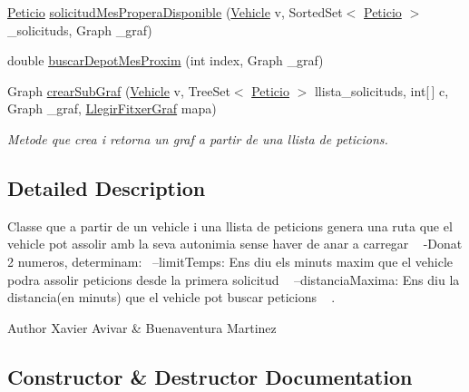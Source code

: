 \begin{DoxyCompactItemize}
\hyperlink{class_portam_a_pro_p_1_1_peticio}{Peticio} \hyperlink{class_portam_a_pro_p_1_1_greedy_aee6b3c5abeb729501fdf82a213ad60b5}{solicitud\+Mes\+Propera\+Disponible} (\hyperlink{class_portam_a_pro_p_1_1_vehicle}{Vehicle} v, Sorted\+Set$<$ \hyperlink{class_portam_a_pro_p_1_1_peticio}{Peticio} $>$ \+\_\+solicituds, Graph \+\_\+graf)
\item 
double \hyperlink{class_portam_a_pro_p_1_1_greedy_a452e5f5e1fd5489666fd9687d91b89c4}{buscar\+Depot\+Mes\+Proxim} (int index, Graph \+\_\+graf)
\item 
Graph \hyperlink{class_portam_a_pro_p_1_1_greedy_ad535a1ddb039e8d8c3d9e61d3d4caee9}{crear\+Sub\+Graf} (\hyperlink{class_portam_a_pro_p_1_1_vehicle}{Vehicle} v, Tree\+Set$<$ \hyperlink{class_portam_a_pro_p_1_1_peticio}{Peticio} $>$ llista\+\_\+solicituds, int\mbox{[}$\,$\mbox{]} c, Graph \+\_\+graf, \hyperlink{class_portam_a_pro_p_1_1_llegir_fitxer_graf}{Llegir\+Fitxer\+Graf} mapa)
\begin{DoxyCompactList}\small\item\em Metode que crea i retorna un graf a partir de una llista de peticions. \end{DoxyCompactList}\end{DoxyCompactItemize}


\subsection{Detailed Description}
Classe que a partir de un vehicle i una llista de peticions genera una ruta que el vehicle pot assolir amb la seva autonimia sense haver de anar a carregar ~\newline
-\/\+Donat 2 numeros, determinam\+:~\newline
--limit\+Temps\+: Ens diu els minuts maxim que el vehicle podra assolir peticions desde la primera solicitud ~\newline
--distancia\+Maxima\+: Ens diu la distancia(en minuts) que el vehicle pot buscar peticions ~\newline
. 

\begin{DoxyAuthor}{Author}
Xavier Avivar \& Buenaventura Martinez 
\end{DoxyAuthor}


\subsection{Constructor \& Destructor Documentation}
\mbox{\label{class_portam_a_pro_p_1_1_greedy_abeac8894d01a8df14d99ced2988d66c3}} 
